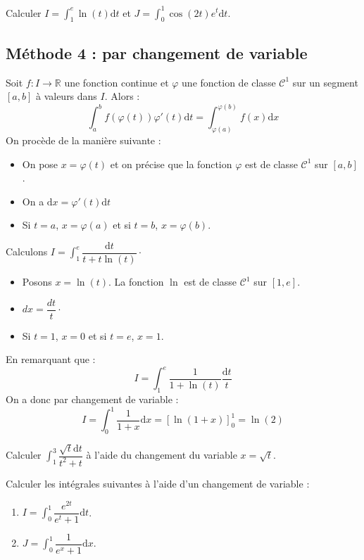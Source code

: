 \documentclass[french,11pt,twoside]{VcCours}
\newcommand{\dx}{\text{d}x}
\newcommand{\dt}{\text{d}t}
\begin{document}
\begin{ApplicationDirecte}{} Calculer $I= \int_{1}^e \ln(t) \dt$ et $J = \int_{0}^1 \cos(2t) e^t \dt$.
\end{ApplicationDirecte}

\subsection{Méthode 4 : par changement de variable}
Soit $f : I \rightarrow \mathbb{R}$ une fonction continue et $\varphi$ une fonction de classe $\mathcal{C}^1$ sur un segment $[a,b]$ à valeurs dans $I$. Alors :
$$ \int_{a}^b f(\varphi(t)) \varphi'(t) \dt = \int_{\varphi(a)}^{\varphi(b)} f(x) \dx$$
On procède de la manière suivante :

\begin{itemize}
\item On pose $x = \varphi(t)$ et on précise que la fonction $\varphi$ est de classe $\mathcal{C}^1$ sur $[a,b]$.
\item On a $\dx = \varphi'(t) \dt$
\item Si $t=a$, $x = \varphi(a)$ et si $t=b$, $x= \varphi(b)$.
\end{itemize}

\medskip

\begin{Exemple} Calculons $I=\int_{1}^{e} \dfrac{\dt}{t+t\ln(t)} \cdot$

\begin{itemize}
\item Posons $x = \ln(t)$. La fonction $\ln$ est de classe $\mathcal{C}^1$ sur $[1,e]$.
\item $dx = \dfrac{dt}{t}\cdot$
\item Si $t=1$, $x=0$ et si $t=e$, $x =1$.
\end{itemize}
En remarquant que :
$$ I = \int_{1}^{e}  \frac{1}{1+\ln(t)} \dfrac{\dt}{t}$$
On a donc par changement de variable :
$$ I= \int_{0}^{1} \dfrac{1}{1+x} \dx= \left[ \ln(1+x) \right]_0^1= \ln(2)$$
\end{Exemple}

\begin{ApplicationDirecte}{} Calculer $\int_{1}^3 \dfrac{\sqrt{t} \dt}{t^2+t}$ à l'aide du changement du variable $x=\sqrt{t}$.
\end{ApplicationDirecte}

\begin{ApplicationDirecte}{}  Calculer les intégrales suivantes à l'aide d'un changement de variable :

\begin{enumerate}
\item $I= \int_{0}^1 \dfrac{e^{2t}}{e^t+1} \dt$.
\item $J = \int_{0}^1 \dfrac{1}{e^x+1} \dx$.
\end{enumerate}
\end{ApplicationDirecte}
\end{document}
